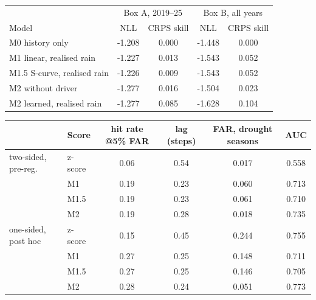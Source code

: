 \begin{tabular}{lcccc}\toprule
 & \multicolumn{2}{c}{Box A, 2019--25} & \multicolumn{2}{c}{Box B, all years}\\
Model & NLL & CRPS skill & NLL & CRPS skill\\\midrule
M0 history only & -1.208 & 0.000 & -1.448 & 0.000\\
M1 linear, realised rain & -1.227 & 0.013 & -1.543 & 0.052\\
M1.5 S-curve, realised rain & -1.226 & 0.009 & -1.543 & 0.052\\
M2 without driver & -1.277 & 0.016 & -1.504 & 0.023\\
M2 learned, realised rain & -1.277 & 0.085 & -1.628 & 0.104\\
\bottomrule\end{tabular}
\begin{tabular}{llcccc}\toprule
 & Score & hit rate @5\% FAR & lag (steps) & FAR, drought seasons & AUC\\\midrule
two-sided, pre-reg. & z-score & 0.06 & 0.54 & 0.017 & 0.558\\
 & M1 & 0.19 & 0.23 & 0.060 & 0.713\\
 & M1.5 & 0.19 & 0.23 & 0.061 & 0.710\\
 & M2 & 0.19 & 0.28 & 0.018 & 0.735\\
\midrule
one-sided, post hoc & z-score & 0.15 & 0.45 & 0.244 & 0.755\\
 & M1 & 0.27 & 0.25 & 0.148 & 0.711\\
 & M1.5 & 0.27 & 0.25 & 0.146 & 0.705\\
 & M2 & 0.28 & 0.24 & 0.051 & 0.773\\
\bottomrule\end{tabular}
